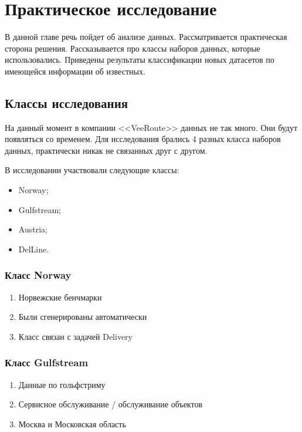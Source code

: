 \chapter{Практическое исследование}

В данной главе речь пойдет об анализе данных.
Рассматривается практическая сторона решения.
Рассказывается про классы наборов данных, которые использовались.
Приведены результаты классификации новых датасетов по имеющейся информации об известных.

\section{Классы исследования}

На данный момент в компании <<VeeRoute>> данных не так много.
Они будут появляться со временем.
Для исследования брались 4 разных класса наборов данных, практически никак не связанных друг с другом.

В исследовании участвовали следующие классы:

\begin{itemize}
	\item Norway;
 	\item Gulfstream;
	\item Austria;
	\item DelLine.
\end{itemize}

\subsection{Класс Norway}

\begin{enumerate}
\item Норвежские бенчмарки
\item Были сгенерированы автоматически
\item Класс связан с задачей Delivery	

\end{enumerate}

\subsection{Класс Gulfstream}

\begin{enumerate}
	\item Данные по гольфстриму
	\item Сервисное обслуживание / обслуживание объектов
	\item Москва и Московская область
\end{enumerate}



